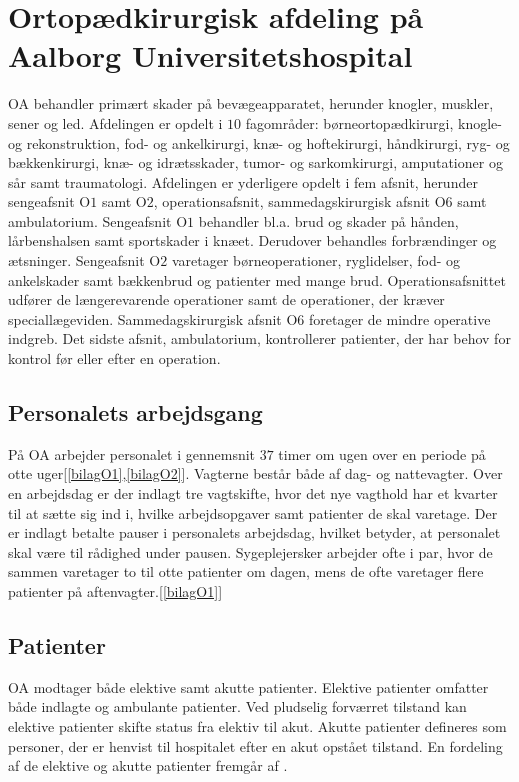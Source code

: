 \section{Ortopædkirurgisk afdeling på Aalborg Universitetshospital}
OA behandler primært skader på bevægeapparatet, herunder knogler, muskler, sener og led. Afdelingen er opdelt i $10$ fagområder: børneortopædkirurgi, knogle- og rekonstruktion, fod- og ankelkirurgi, knæ- og hoftekirurgi, håndkirurgi, ryg- og bækkenkirurgi, knæ- og idrætsskader, tumor- og sarkomkirurgi, amputationer og sår samt traumatologi. Afdelingen er yderligere opdelt i fem afsnit, herunder sengeafsnit O$1$ samt O$2$, operationsafsnit, sammedagskirurgisk afsnit O$6$ samt ambulatorium. 
Sengeafsnit O$1$ behandler bl.a. brud og skader på hånden, lårbenshalsen samt sportskader i knæet. Derudover behandles forbrændinger og ætsninger. Sengeafsnit O$2$ varetager børneoperationer, ryglidelser, fod- og ankelskader samt bækkenbrud og patienter med mange brud. Operationsafsnittet udfører de længerevarende operationer samt de operationer, der kræver speciallægeviden. Sammedagskirurgisk afsnit O$6$ foretager de mindre operative indgreb. Det sidste afsnit, ambulatorium, kontrollerer patienter, der har behov for kontrol før eller efter en operation.\cite{Aalborg2016}

\subsection{Personalets arbejdsgang} \label{arb_per}
På OA arbejder personalet i gennemsnit $37$ timer om ugen over en periode på otte uger\cite{Danske2015}[\ref{bilagO1},\ref{bilagO2}]. Vagterne består både af dag- og nattevagter. Over en arbejdsdag er der indlagt tre vagtskifte, hvor det nye vagthold har et kvarter til at sætte sig ind i, hvilke arbejdsopgaver samt patienter de skal varetage. Der er indlagt betalte pauser i personalets arbejdsdag, hvilket betyder, at personalet skal være til rådighed under pausen. Sygeplejersker arbejder ofte i par, hvor de sammen varetager to til otte patienter om dagen, mens de ofte varetager flere patienter på aftenvagter.[\ref{bilagO1}]

\subsection{Patienter}
OA modtager både elektive samt akutte patienter. Elektive patienter omfatter både indlagte og ambulante patienter. Ved pludselig forværret tilstand kan elektive patienter skifte status fra elektiv til akut. Akutte patienter defineres som personer, der er henvist til hospitalet efter en akut opstået tilstand.\cite{RegionNord2016} En fordeling af de elektive og akutte patienter fremgår af .

